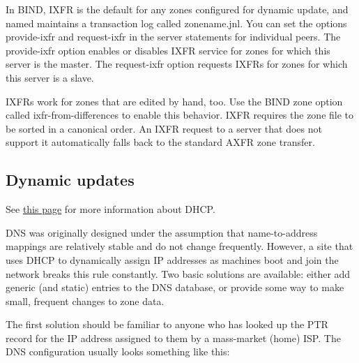 In BIND, IXFR is the default for any zones configured for dynamic
update, and {named} maintains a transaction log called {zonename}{.jnl}.
You can set the options {provide-ixfr} and {request-ixfr} in the
{server} statements for individual peers. The {provide-ixfr} option
enables or disables IXFR service for zones for which this server is the
master. The {request-ixfr} option requests IXFRs for zones for which
this server is a slave.


IXFRs work for zones that are edited by hand, too. Use the BIND zone
option called {ixfr-from-differences} to enable this behavior. IXFR
requires the zone file to be sorted in a canonical order. An IXFR
request to a server that does not support it automatically falls back to
the standard AXFR zone transfer.

\protect\hypertarget{part0024_split_052.html}{}{}

\hypertarget{part0024_split_052.htmlux5cux23_idContainer1069}{}
\hypertarget{part0024_split_052.htmlux5cux23calibre_pb_51}{%
\subsection[Dynamic
updates]{\texorpdfstring{\protect\hypertarget{part0024_split_052.htmlux5cux23_idTextAnchor928}{}{}Dynamic
updates}{Dynamic updates}}\label{part0024_split_052.htmlux5cux23calibre_pb_51}}

\leavevmode\hypertarget{part0024_split_052.htmlux5cux23_idContainer1015}{}%
See
\protect\hyperlink{part0021_split_027.htmlux5cux23_idTextAnchor674}{this
page} for more information about DHCP.

\protect\hypertarget{part0024_split_052.htmlux5cux23_idIndexMarker2224}{}{}\protect\hypertarget{part0024_split_052.htmlux5cux23_idIndexMarker2225}{}{}DNS
was originally designed under the assumption that name-to-address
\protect\hypertarget{part0024_split_052.htmlux5cux23_idIndexMarker2226}{}{}mappings
are relatively stable and do not change frequently. However, a site that
uses DHCP to dynamically assign IP addresses as machines boot and join
the network breaks this rule constantly. Two basic solutions are
available: either add generic (and static) entries to the DNS database,
or provide some way to make small, frequent changes to zone data.

The first solution should be familiar to anyone who has looked up the
PTR record for the IP address assigned to them by a mass-market (home)
ISP. The DNS configuration usually looks something like this:

